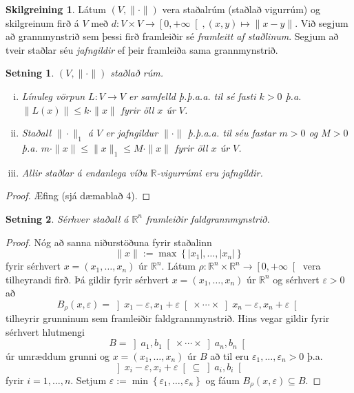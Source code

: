 \documentclass[a4paper,icelandic]{book}
\theoremstyle{definition}
\newtheorem{skilgr}{Skilgreining}[section]
\theoremstyle{plain}
\newtheorem{setn}{Setning}[section]
\theoremstyle{remark}
\newcommand{\R}{\mathbb{R}} %
\begin{document}
\begin{skilgr}
  Látum $(V,\|\cdot\|)$ vera staðalrúm (staðlað vigurrúm) og
  skilgreinum firð á $V$ með $d:V\times V\to \left[ 0,+\infty \right[,
  (x,y)\mapsto \|x-y\|$. Við segjum að grannmynstrið sem þessi firð framleiðir
  sé \emph{framleitt af staðlinum}. Segjum að tveir staðlar séu
  \emph{jafngildir} ef þeir framleiða sama grannmynstrið.
\end{skilgr}
\begin{setn}
  $(V,\|\cdot\|)$ staðlað rúm. 
  \begin{enumerate}[(i)]
    \item Línuleg vörpun $L:V\to V$ er samfelld \emph{þ.þ.a.a.}
      til sé fasti $k>0$ þ.a.  $\|L(x)\|\leq k\cdot\|x\|$ fyrir öll $x$ úr $V$.
    \item Staðall $\|\cdot\|_1$ á $V$ er jafngildur $\|\cdot\|$ \emph{þ.þ.a.a.}
      til séu fastar $m>0$ og $M>0$ þ.a. $m\cdot\|x\|\leq \|x\|_1\leq
      M\cdot\|x\|$ fyrir öll $x$ úr $V$.
    \item Allir staðlar á endanlega víðu $\R$-vigurrúmi eru jafngildir. 
  \end{enumerate}
\end{setn}
\begin{proof}
  Æfing (sjá dæmablað 4).
\end{proof}
\begin{setn}
  Sérhver staðall á $\R^n$ framleiðir faldgrannmynstrið.
\end{setn}
\begin{proof}
  Nóg að sanna niðurstöðuna fyrir staðalinn\[
  \|x\|:=\max\left\{ |x_1|,\dots,|x_n| \right\}
  \]
  fyrir sérhvert $x = (x_1,\dots,x_n)$ úr $\R^n$. Látum
  $\rho:\R^n\times\R^n\to\left[ 0,+\infty \right[$ vera tilheyrandi firð. Þá
  gildir fyrir sérhvert $x=(x_1,\dots,x_n)$ úr $\R^n$ og sérhvert $\varepsilon
  >0$ að\[
  B_\rho(x,\varepsilon) 
  = \left] x_1-\varepsilon,x_1+\varepsilon \right[
  \times\cdots\times\left] x_n-\varepsilon,x_n+\varepsilon \right[
  \]
  tilheyrir grunninum sem framleiðir faldgrannmynstrið. Hins vegar gildir fyrir
  sérhvert hlutmengi\[
  B = \left] a_1,b_1 \right[\times\cdots\times\left] a_n,b_n \right[
  \]
  úr umræddum grunni og $x = (x_1,\dots,x_n)$ úr $B$ að til eru
  $\varepsilon_1,\dots,\varepsilon_n>0$ þ.a.\[
  \left] x_i-\varepsilon,x_i+\varepsilon \right[
  \subseteq
  \left] a_i,b_i\right[
  \]
  fyrir $i=1,\dots,n$. Setjum $\varepsilon:=\min\left\{
  \varepsilon_1,\dots,\varepsilon_n \right\}$ og fáum
  $B_\rho(x,\varepsilon)\subseteq B$.
\end{proof}
\end{document}
